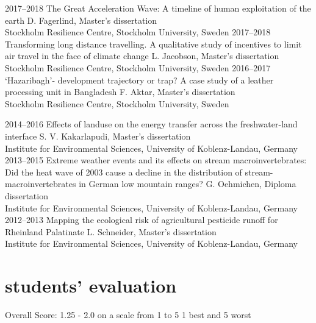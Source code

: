 \documentclass[]{friggeri-cv} %
\begin{document}
\begin{entrylist}
\entry
{\small{2017--2018}}
{The Great Acceleration Wave: A timeline of human exploitation of the earth}
{}
{D. Fagerlind, Master's dissertation \\
Stockholm Resilience Centre, Stockholm University, Sweden}
\entry
{\small{2017--2018}}
{Transforming long distance travelling. A qualitative study of incentives to limit air travel in the face of climate change}
{}
{L. Jacobson, Master's dissertation \\
Stockholm Resilience Centre, Stockholm University, Sweden}
\entry
{\small{2016--2017}}
{‘Hazaribagh’- development trajectory or trap? A case study of a leather processing unit in Bangladesh}
{}
{F. Aktar, Master's dissertation \\
Stockholm Resilience Centre, Stockholm University, Sweden}
\end{entrylist}
\begin{entrylist}
\entry
{\small{2014--2016}}
{Effects of landuse on the energy transfer across the freshwater-land interface}
{}
{S. V. Kakarlapudi, Master's dissertation \\
Institute for Environmental Sciences, University of Koblenz-Landau, Germany}
\entry
{\small{2013--2015}}
{Extreme weather events and its effects on stream macroinvertebrates: Did the heat wave of 2003 cause a decline in the distribution of stream-macroinvertebrates in German low mountain ranges?}
{}
{G. Oehmichen, Diploma dissertation \\
Institute for Environmental Sciences, University of Koblenz-Landau, Germany}
\entry
{\small{2012--2013}}
{Mapping the ecological risk of agricultural pesticide runoff for Rheinland Palatinate}
{}
{L. Schneider, Master's dissertation \\
Institute for Environmental Sciences, University of Koblenz-Landau, Germany}
\end{entrylist}


\section{students' evaluation}

\begin{entrylist}
\entry
{}
{Overall Score: 1.25 - 2.0 on a scale from 1 to 5}
{1 best and 5 worst}
{}
\end{entrylist}
\end{document}
